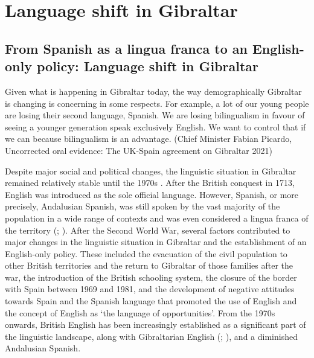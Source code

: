 \documentclass[output=paper]{langscibook}
\begin{document}
\section{Language shift in Gibraltar}\label{RG:sec:02}

\subsection{From Spanish as a lingua franca to an English-only policy: Language shift in Gibraltar}
\label{RG:sec:02_1}

\begin{modquote}
Given what is happening in Gibraltar today, the way demographically Gibraltar is changing is concerning in some respects. For example, a lot of our young people are losing their second language, Spanish. We are losing bilingualism in favour of seeing a younger generation speak exclusively English. We want to control that if we can because bilingualism is an advantage. (Chief Minister Fabian Picardo, Uncorrected oral evidence: The UK-Spain agreement on Gibraltar 2021)
\end{modquote}

Despite major social and political changes, the linguistic situation in Gibraltar remained relatively stable until the 1970s
\citep{mariscal_rios_consecuencias_2014}. After the British conquest in 1713, English was introduced as the sole official language. However, Spanish, or more precisely, Andalusian Spanish, was still spoken by the vast majority of the population in a wide range of contexts and was even considered a lingua franca of the territory (\citealt{moyer_analysis_1993}; \citealt{mariscal_rios_consecuencias_2014}). After the Second World War, several factors contributed to major changes in the linguistic situation in Gibraltar and the establishment of an English-only policy. These included the evacuation of the civil population to other British territories and the return to Gibraltar of those families after the war, the introduction of the British schooling system, the closure of the border with Spain between 1969 and 1981, and the development of negative attitudes towards Spain and the Spanish language that promoted the use of English and the concept of English as ‘the language of opportunities’. From the 1970s onwards, British English has been increasingly established as a significant part of the linguistic landscape, along with Gibraltarian English
(\citealt{levey_schreier_gibraltar_2015}; \citealt{suarez-gomez_english_2020}), and a diminished Andalusian Spanish.
\end{document}
